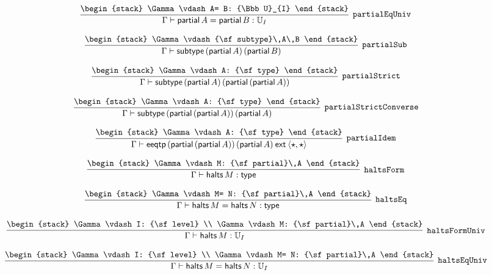 \[
\infer[{\tt partialEqUniv}]{\Gamma \vdash {\sf partial}\,A= {\sf partial}\,B: {\Bbb U}_{I}}{
\begin{stack}
\Gamma \vdash A= B: {\Bbb U}_{I}
\end{stack}}
\]

\[
\infer[{\tt partialSub}]{\Gamma \vdash {\sf subtype}\,({\sf partial}\,A)\,({\sf partial}\,B)}{
\begin{stack}
\Gamma \vdash {\sf subtype}\,A\,B
\end{stack}}
\]

\[
\infer[{\tt partialStrict}]{\Gamma \vdash {\sf subtype}\,({\sf partial}\,A)\,({\sf partial}\,({\sf partial}\,A))}{
\begin{stack}
\Gamma \vdash A: {\sf type}
\end{stack}}
\]

\[
\infer[{\tt partialStrictConverse}]{\Gamma \vdash {\sf subtype}\,({\sf partial}\,({\sf partial}\,A))\,({\sf partial}\,A)}{
\begin{stack}
\Gamma \vdash A: {\sf type}
\end{stack}}
\]

\[
\infer[{\tt partialIdem}]{\Gamma \vdash {\sf eeqtp}\,({\sf partial}\,({\sf partial}\,A))\,({\sf partial}\,A)\:{\sf ext}\:\langle \star ,\star \rangle }{
\begin{stack}
\Gamma \vdash A: {\sf type}
\end{stack}}
\]

\[
\infer[{\tt haltsForm}]{\Gamma \vdash {\sf halts}\,M: {\sf type}}{
\begin{stack}
\Gamma \vdash M: {\sf partial}\,A
\end{stack}}
\]

\[
\infer[{\tt haltsEq}]{\Gamma \vdash {\sf halts}\,M= {\sf halts}\,N: {\sf type}}{
\begin{stack}
\Gamma \vdash M= N: {\sf partial}\,A
\end{stack}}
\]

\[
\infer[{\tt haltsFormUniv}]{\Gamma \vdash {\sf halts}\,M: {\Bbb U}_{I}}{
\begin{stack}
\Gamma \vdash I: {\sf level}
\\
\Gamma \vdash M: {\sf partial}\,A
\end{stack}}
\]

\[
\infer[{\tt haltsEqUniv}]{\Gamma \vdash {\sf halts}\,M= {\sf halts}\,N: {\Bbb U}_{I}}{
\begin{stack}
\Gamma \vdash I: {\sf level}
\\
\Gamma \vdash M= N: {\sf partial}\,A
\end{stack}}
\]

